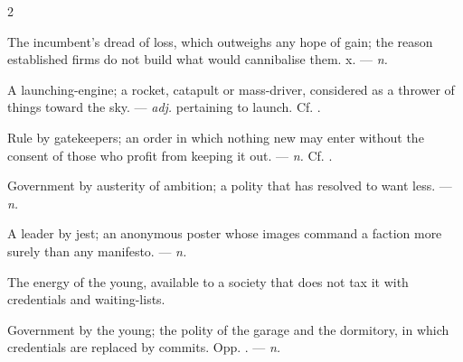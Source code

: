 \begin{multicols}{2}

 The incumbent's dread of loss, which outweighs any hope of gain; the reason established firms do not build what would cannibalise them.   x. —  \textit{n.}

 A launching-engine; a rocket, catapult or mass-driver, considered as a thrower of things toward the sky. —  \textit{adj.} pertaining to launch. Cf. .

 Rule by gatekeepers; an order in which nothing new may enter without the consent of those who profit from keeping it out. —  \textit{n.} Cf. .

 Government by austerity of ambition; a polity that has resolved to want less. —  \textit{n.}

 A leader by jest; an anonymous poster whose images command a faction more surely than any manifesto.   —  \textit{n.}

 The energy of the young, available to a society that does not tax it with credentials and waiting-lists. 

 Government by the young; the polity of the garage and the dormitory, in which credentials are replaced by commits. Opp. . —  \textit{n.}

\end{multicols}

